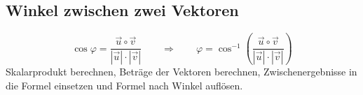 \begin{multicols}{3}
\subsection*{Winkel zwischen zwei Vektoren}

\begin{equation*}
    \cos\varphi = \frac{\vec{u}\circ\vec{v}}{\left|\vec{u}\right|\cdot\left|\vec{v}\right|} \qquad \Rightarrow \qquad \varphi = \cos^{-1}\left(\frac{\vec{u}\circ\vec{v}}{\left|\vec{u}\right|\cdot\left|\vec{v}\right|}\right)
\end{equation*}
Skalarprodukt berechnen, Beträge der Vektoren berechnen, Zwischenergebnisse in die Formel einsetzen und Formel nach Winkel auflösen.

\newpage

\end{multicols}